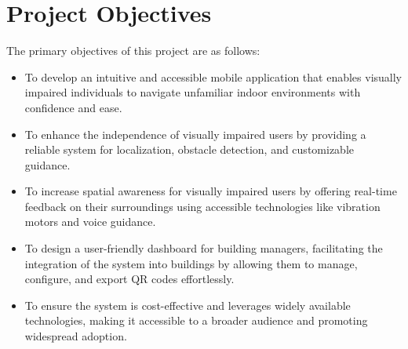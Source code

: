 \section{Project Objectives}

The primary objectives of this project are as follows:

\begin{itemize}
	\item To develop an intuitive and accessible mobile application that enables visually impaired individuals to navigate unfamiliar indoor environments with confidence and ease.
	\item To enhance the independence of visually impaired users by providing a reliable system for localization, obstacle detection, and customizable guidance.
	\item To increase spatial awareness for visually impaired users by offering real-time feedback on their surroundings using accessible technologies like vibration motors and voice guidance.
	\item To design a user-friendly dashboard for building managers, facilitating the integration of the system into buildings by allowing them to manage, configure, and export QR codes effortlessly.
	\item To ensure the system is cost-effective and leverages widely available technologies, making it accessible to a broader audience and promoting widespread adoption.
\end{itemize}
